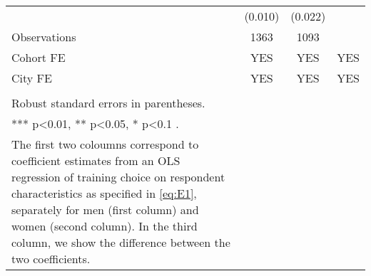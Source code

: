 \begin{longtable}{m{9cm}ccc}
&(0.010)&(0.022)&\\
Observations&1363&1093&\\
Cohort FE&YES&YES&YES\\
City FE&YES&YES&YES\\
\midrule
\begin{minipage}{16cm}
\small{
{\textit Notes:} \\
Robust standard errors in parentheses. \\
*** p\textless{}0.01, ** p\textless{}0.05, * p\textless{}0.1 . \\
The first two coloumns correspond to coefficient estimates from an OLS regression of training choice on respondent characteristics as specified in  \ref{eq:E1}, separately for men (first column) and women (second column). In the third column, we show the difference between the two coefficients. 
}
\end{minipage} \\* \bottomrule
\end{longtable}

